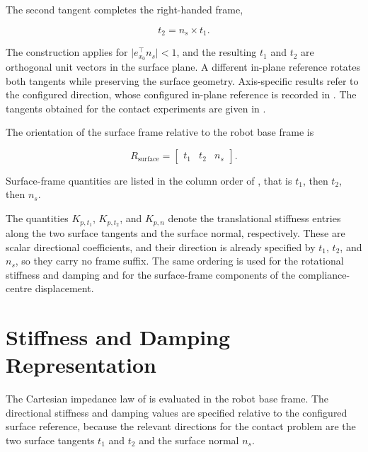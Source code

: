 The second tangent completes the right-handed frame,

\begin{equation}
t_2=n_s\times t_1 .
\label{eq:surface_frame_second_tangent}
\end{equation}

The construction applies for
\mbox{\(\lvert e_{x_0}^{\top}n_s\rvert<1\)}, and the resulting
\mbox{\(t_1\)} and \mbox{\(t_2\)} are orthogonal unit vectors in the surface
plane. A different in-plane reference rotates both tangents while preserving
the surface geometry. Axis-specific results refer to the configured
direction, whose configured in-plane reference is recorded in
\mbox{}. The tangents obtained for the contact
experiments are given in \mbox{}.

The orientation of the surface frame relative to the robot base frame is

\begin{equation}
R_{\mathrm{surface}}
=
\begin{bmatrix}
t_1 & t_2 & n_s
\end{bmatrix}.
\label{eq:surface_task_frame_matrix}
\end{equation}

Surface-frame quantities are listed in the column order of
\mbox{}, that is \mbox{\(t_1\)}, then
\mbox{\(t_2\)}, then \mbox{\(n_s\)}.

The quantities \mbox{\(K_{p,t_1}\)}, \mbox{\(K_{p,t_2}\)}, and
\mbox{\(K_{p,n}\)} denote the translational stiffness entries along the two
surface tangents and the surface normal, respectively. These are scalar
directional coefficients, and their direction is already specified by
\mbox{\(t_1\)}, \mbox{\(t_2\)}, and \mbox{\(n_s\)}, so they carry no
frame suffix. The same ordering is used for the rotational stiffness and
damping and for the surface-frame components of the compliance-centre
displacement.


\section{Stiffness and Damping Representation}
\label{sec:stiffness_damping_representation}

The Cartesian impedance law of \mbox{} is
evaluated in the robot base frame. The directional stiffness and damping values
are specified relative to the configured surface reference, because the relevant
directions for the contact problem are the two surface tangents
\mbox{\(t_1\)} and \mbox{\(t_2\)} and the surface normal \mbox{\(n_s\)}.

